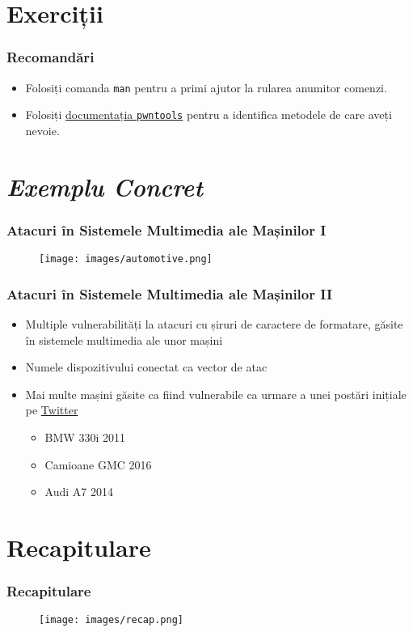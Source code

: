 \documentclass[xcolor={table}]{beamer}
\begin{document}
	\section{Exerciții}

	\begin{frame}
		\frametitle{Recomandări}\pause
		\begin{itemize}[<+->]
		    \item Folosiți comanda \texttt{man} pentru a primi ajutor la rularea anumitor comenzi.
		    \item Folosiți \href{https://docs.pwntools.com/en/stable/}{documentația \texttt{pwntools}} pentru a identifica metodele de care aveți nevoie.
	    \end{itemize}
	\end{frame}

	\section{\textit{Exemplu Concret}}

	\begin{frame}
		\frametitle{Atacuri în Sistemele Multimedia ale Mașinilor I}\pause
		\begin{figure}
            \centering
            \texttt{[image: images/automotive.png]}
        \end{figure}
    \end{frame}

	\begin{frame}
		\frametitle{Atacuri în Sistemele Multimedia ale Mașinilor II}\pause
		\begin{itemize}[<+->]
		    \item Multiple vulnerabilități la atacuri cu șiruri de caractere de formatare, găsite în sistemele multimedia ale unor mașini
		    \item Numele dispozitivului conectat ca vector de atac
		    \item Mai multe mașini găsite ca fiind vulnerabile ca urmare a unei postări inițiale pe \href{https://twitter.com/0xRaindrop/status/864704956116254720}{Twitter}
    		    \begin{itemize}
    			    \item BMW 330i 2011
    			    \item Camioane GMC 2016
    			    \item Audi A7 2014 
    			\end{itemize}
		\end{itemize}
	\end{frame}

	\section{Recapitulare}

	\begin{frame}
		\frametitle{Recapitulare}\pause
		\begin{figure}
            \centering
            \texttt{[image: images/recap.png]}
        \end{figure}
	\end{frame}
\end{document}
